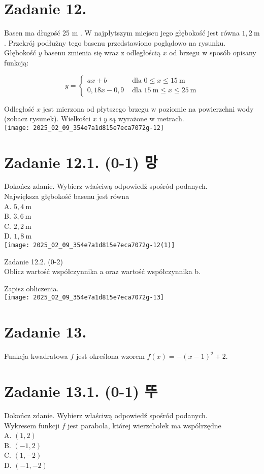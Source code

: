 \documentclass[10pt]{article}
\begin{document}
\section*{Zadanie 12.}
Basen ma długość 25 m . W najpłytszym miejscu jego głębokość jest równa \(1,2 \mathrm{~m}\). Przekrój podłużny tego basenu przedstawiono poglądowo na rysunku.\\
Głębokość \(y\) basenu zmienia się wraz z odległością \(x\) od brzegu w sposób opisany funkcją:

\[
y= \begin{cases}a x+b & \text { dla } 0 \leq x \leq 15 \mathrm{~m} \\ 0,18 x-0,9 & \text { dla } 15 \mathrm{~m} \leq x \leq 25 \mathrm{~m}\end{cases}
\]

Odległość \(x\) jest mierzona od płytszego brzegu w poziomie na powierzchni wody (zobacz rysunek). Wielkości \(x\) i \(y\) są wyrażone w metrach.\\
\texttt{[image: 2025\_02\_09\_354e7a1d815e7eca7072g-12]}

\section*{Zadanie 12.1. (0-1) 망}
Dokończ zdanie. Wybierz właściwą odpowiedź spośród podanych.\\
Największa głębokość basenu jest równa\\
A. \(5,4 \mathrm{~m}\)\\
B. \(3,6 \mathrm{~m}\)\\
C. \(2,2 \mathrm{~m}\)\\
D. \(1,8 \mathrm{~m}\)\\
\texttt{[image: 2025\_02\_09\_354e7a1d815e7eca7072g-12(1)]}

Zadanie 12.2. (0-2)\\
Oblicz wartość współczynnika a oraz wartość współczynnika b.

Zapisz obliczenia.\\
\texttt{[image: 2025\_02\_09\_354e7a1d815e7eca7072g-13]}

\section*{Zadanie 13.}
Funkcja kwadratowa \(f\) jest określona wzorem \(f(x)=-(x-1)^{2}+2\).

\section*{Zadanie 13.1. (0-1) 뚜}
Dokończ zdanie. Wybierz właściwą odpowiedź spośród podanych.\\
Wykresem funkcji \(f\) jest parabola, której wierzchołek ma współrzędne\\
A. \((1,2)\)\\
B. \((-1,2)\)\\
C. \((1,-2)\)\\
D. \((-1,-2)\)
\end{document}
